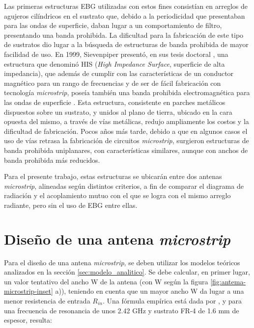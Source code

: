 Las primeras estructuras EBG utilizadas con estos fines consistían en arreglos de agujeros cilíndricos en el sustrato que, debido a la periodicidad que presentaban para las ondas de superficie, daban lugar a un comportamiento de filtro, presentando una banda prohibida. La dificultad para la fabricación de este tipo de sustratos dio lugar a la búsqueda de estructuras de banda prohibida de mayor facilidad de uso. En 1999, Sievenpiper presentó, en sus tesis doctoral \cite{Sievenpiper:Thesis}, una estructura que denominó HIS (\textit{High Impedance Surface}, superficie de alta impedancia), que además de cumplir con las características de un conductor magnético para un rango de frecuencias \cite{Sievenpiper:HIESForbiddenBand} y de ser de fácil fabricación con tecnología \textit{microstrip}, poseía también una banda prohibida electromagnética para las ondas de superficie \cite{Marcela:Tesis}. Esta estructura, consistente en parches metálicos dispuestos sobre un sustrato, y unidos al plano de tierra, ubicado en la cara opuesta del mismo, a través de vías metálicas, redujo ampliamente los costos y la dificultad de fabricación. Pocos años más tarde, debido a que en algunos casos el uso de vías retrasa la fabricación de circuitos \textit{microstrip}, surgieron estructuras de banda prohibida uniplanares, con características similares, aunque con anchos de banda prohibida más reducidos.

Para el presente trabajo, estas estructuras se ubicarán entre dos antenas \textit{microstrip}, alineadas según distintos criterios, a fin de comparar el diagrama de radiación y el acoplamiento mutuo con el que se logra con el mismo arreglo radiante, pero sin el uso de EBG entre ellas.

\section{Diseño de una antena \textit{microstrip}}
\label{sec_disenio_microstrip}
Para el diseño de una antena \textit{microstrip}, se deben utilizar los modelos teóricos analizados en la sección \ref{sec:modelo_analitico}. Se debe calcular, en primer lugar, un valor tentativo del ancho W de la antena (con W según la figura \ref{fig:antema-microstrip-inset} a)), teniendo en cuenta que un mayor ancho W da lugar a una menor resistencia de entrada $R_{in}$. Una fórmula empírica está dada por \cite{Barthia:Handbook}, y para una frecuencia de resonancia de unos 2.42 GHz y sustrato FR-4 de 1.6 mm de espesor, resulta:

